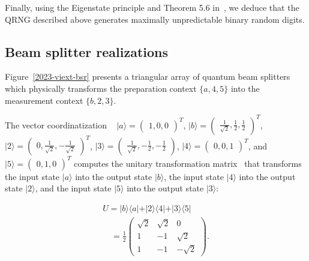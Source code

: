 \documentclass[%
 superscriptaddress,
  preprint,
 showpacs,
 showkeys,
 nofootinbib,
  amsmath,amssymb,
 pra,
  longbibliography,
  floatfix,
 ]{revtex4-2}
\theoremstyle{definition}
\begin{document}
Finally, using the Eigenstate principle
and Theorem 5.6 in~\cite{RSPA23}, we deduce that the QRNG described above generates maximally unpredictable binary random digits.
\subsection{Beam splitter realizations}

Figure~\ref{2023-viext-bsr} presents a triangular array of quantum  beam splitters
 which physically transforms the preparation context  $\{a,4,5\}$
into the measurement context $\{b,2,3\}$.

The vector coordinatization ~\cite[Table~I]{2018-minimalYIYS}
$\vert a \rangle = \begin{pmatrix} 1, 0, 0\end{pmatrix}^T$,
$\vert b \rangle = \begin{pmatrix} \frac1{\sqrt{2}}, \frac12, \frac12 \end{pmatrix}^T$,
$\vert 2 \rangle = \begin{pmatrix} 0, \frac1{\sqrt{2}}, -\frac1{\sqrt{2}} \end{pmatrix}^T$,
$\vert 3 \rangle = \begin{pmatrix} \frac1{\sqrt{2}}, -\frac12, -\frac12 \end{pmatrix}$,
$\vert 4 \rangle = \begin{pmatrix} 0, 0, 1\end{pmatrix}^T$, and
$\vert 5 \rangle = \begin{pmatrix} 0, 1, 0\end{pmatrix}^T$
computes the unitary transformation matrix~\cite{Schwinger.60,Joglekar-I}
that transforms the input state $\vert a\rangle$ into the output state $\vert b\rangle$,
 the input state $\vert 4\rangle$ into the output state $\vert 2\rangle$,
and  the input state $\vert 5\rangle$ into the output state $\vert 3\rangle$:

\begin{equation}
\begin{split}
U =
\vert b \rangle \langle a \vert
+
\vert 2 \rangle \langle 4 \vert
+
\vert 3 \rangle \langle 5 \vert  \\
\quad =  \frac12
\begin{pmatrix}
\sqrt{2} &  \sqrt{2}& 0\\
1& -1&  \sqrt{2} \\
1& -1& - \sqrt{2}
\end{pmatrix}
.
\end{split}
\label{2023-viext-uo}
\end{equation}
\end{document}
